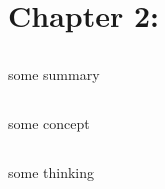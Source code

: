 \documentclass[12pt,a4paper]{book}
\begin{document}
\chapter{Chapter 2:}
\section{}
\begin{notebox}[Summary]
some summary
\end{notebox}

\section{}
\begin{notebox}[Concept]
some concept 
\end{notebox}

\section{}
\begin{notebox}[Thinking]
some thinking
\end{notebox}
\end{document}
